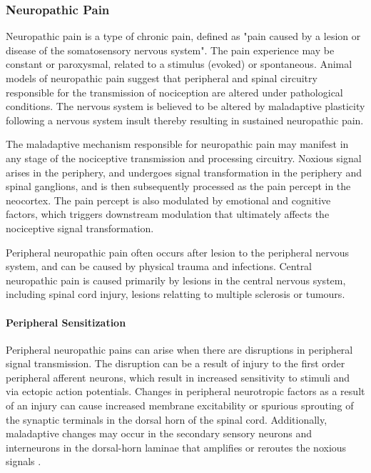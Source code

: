 \subsubsection{Neuropathic Pain}

Neuropathic pain is a type of chronic pain, defined as "pain caused by a lesion or disease of the somatosensory nervous system"\cite{Merskey2012}. The pain experience may be constant or paroxysmal, related to a stimulus (evoked) or spontaneous. Animal models of neuropathic pain suggest that peripheral and spinal circuitry responsible for the transmission of nociception are altered under pathological conditions. The nervous system is believed to be altered by maladaptive plasticity following a nervous system insult thereby resulting in sustained neuropathic pain.

The maladaptive mechanism responsible for neuropathic pain may manifest in any stage of the nociceptive transmission and processing circuitry. 
Noxious signal arises in the periphery, and undergoes signal transformation in the periphery and spinal ganglions, and is then subsequently processed as the pain percept in the neocortex. The pain percept is also modulated by emotional and cognitive factors, which triggers downstream modulation that ultimately affects the nociceptive signal transformation. 

Peripheral neuropathic pain often occurs after lesion to the peripheral nervous system, and can be caused by physical trauma and infections. Central neuropathic pain is caused primarily by lesions in the central nervous system, including spinal cord injury, lesions relatting to multiple sclerosis or tumours. 


\paragraph{Peripheral Sensitization}

Peripheral neuropathic pains can arise when there are disruptions in peripheral signal transmission. The disruption can be a result of injury to the first order peripheral afferent neurons, which result in increased sensitivity to stimuli and via ectopic action potentials. Changes in peripheral neurotropic factors as a result of an injury can cause increased membrane excitability or spurious sprouting of the synaptic terminals in the dorsal horn of the spinal cord. Additionally, maladaptive changes may occur in the secondary sensory neurons and interneurons in the dorsal-horn laminae that amplifies or reroutes the noxious signals \cite{Elmes2004}.

